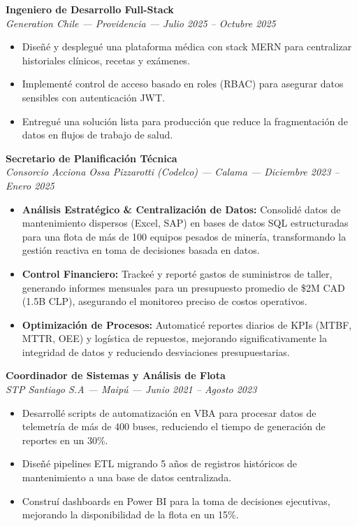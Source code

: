 \documentclass[10pt,letterpaper]{article}
\begin{document}
\vspace{0.3cm}

\noindent \textbf{Ingeniero de Desarrollo Full-Stack} \\
\textit{Generation Chile — Providencia — Julio 2025 – Octubre 2025}
\begin{itemize}
    \item Diseñé y desplegué una plataforma médica con stack MERN para centralizar historiales clínicos, recetas y exámenes.
    \item Implementé control de acceso basado en roles (RBAC) para asegurar datos sensibles con autenticación JWT.
    \item Entregué una solución lista para producción que reduce la fragmentación de datos en flujos de trabajo de salud.
\end{itemize}

\vspace{0.2cm}

\noindent \textbf{Secretario de Planificación Técnica} \\
\textit{Consorcio Acciona Ossa Pizzarotti (Codelco) — Calama — Diciembre 2023 – Enero 2025}
\begin{itemize}
    \item \textbf{Análisis Estratégico \& Centralización de Datos:} Consolidé datos de mantenimiento dispersos (Excel, SAP) en bases de datos SQL estructuradas para una flota de más de 100 equipos pesados de minería, transformando la gestión reactiva en toma de decisiones basada en datos.
    \item \textbf{Control Financiero:} Trackeé y reporté gastos de suministros de taller, generando informes mensuales para un presupuesto promedio de \$2M CAD (1.5B CLP), asegurando el monitoreo preciso de costos operativos.
    \item \textbf{Optimización de Procesos:} Automaticé reportes diarios de KPIs (MTBF, MTTR, OEE) y logística de repuestos, mejorando significativamente la integridad de datos y reduciendo desviaciones presupuestarias.
\end{itemize}

\vspace{0.2cm}

\noindent \textbf{Coordinador de Sistemas y Análisis de Flota} \\
\textit{STP Santiago S.A — Maipú — Junio 2021 – Agosto 2023}
\begin{itemize}
    \item Desarrollé scripts de automatización en VBA para procesar datos de telemetría de más de 400 buses, reduciendo el tiempo de generación de reportes en un 30\%.
    \item Diseñé pipelines ETL migrando 5 años de registros históricos de mantenimiento a una base de datos centralizada.
    \item Construí dashboards en Power BI para la toma de decisiones ejecutivas, mejorando la disponibilidad de la flota en un 15\%.
\end{itemize}
\end{document}
